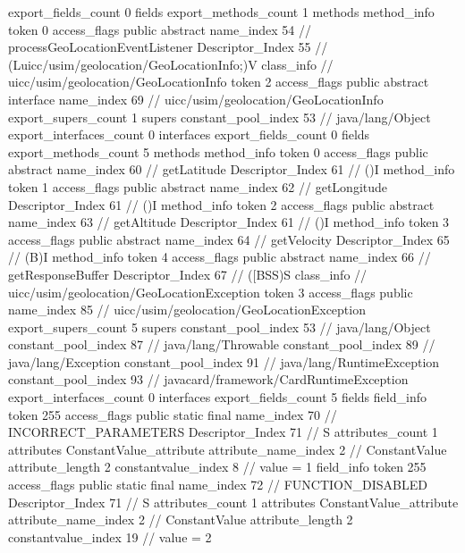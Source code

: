 {{{{			}
			export_fields_count	0
			fields {
			}
			export_methods_count	1
			methods {
				method_info {
					token	0
					access_flags	public abstract
					name_index	54		// processGeoLocationEventListener
					Descriptor_Index	55		// (Luicc/usim/geolocation/GeoLocationInfo;)V
				}
			}
		}
		class_info {		// uicc/usim/geolocation/GeoLocationInfo
			token	2
			access_flags	public abstract interface
			name_index	69		// uicc/usim/geolocation/GeoLocationInfo
			export_supers_count	1
			supers {
				constant_pool_index	53		// java/lang/Object
			}
			export_interfaces_count	0
			interfaces {
			}
			export_fields_count	0
			fields {
			}
			export_methods_count	5
			methods {
				method_info {
					token	0
					access_flags	public abstract
					name_index	60		// getLatitude
					Descriptor_Index	61		// ()I
				}
				method_info {
					token	1
					access_flags	public abstract
					name_index	62		// getLongitude
					Descriptor_Index	61		// ()I
				}
				method_info {
					token	2
					access_flags	public abstract
					name_index	63		// getAltitude
					Descriptor_Index	61		// ()I
				}
				method_info {
					token	3
					access_flags	public abstract
					name_index	64		// getVelocity
					Descriptor_Index	65		// (B)I
				}
				method_info {
					token	4
					access_flags	public abstract
					name_index	66		// getResponseBuffer
					Descriptor_Index	67		// ([BSS)S
				}
			}
		}
		class_info {		// uicc/usim/geolocation/GeoLocationException
			token	3
			access_flags	public
			name_index	85		// uicc/usim/geolocation/GeoLocationException
			export_supers_count	5
			supers {
				constant_pool_index	53		// java/lang/Object
				constant_pool_index	87		// java/lang/Throwable
				constant_pool_index	89		// java/lang/Exception
				constant_pool_index	91		// java/lang/RuntimeException
				constant_pool_index	93		// javacard/framework/CardRuntimeException
			}
			export_interfaces_count	0
			interfaces {
			}
			export_fields_count	5
			fields {
			field_info {
				token	255
				access_flags	public static final
				name_index	70		// INCORRECT_PARAMETERS
				Descriptor_Index	71		// S
				attributes_count	1
				attributes {
				ConstantValue_attribute {
					attribute_name_index	2		// ConstantValue
					attribute_length	2
					constantvalue_index	8		// value = 1
				}
				}
			}
			field_info {
				token	255
				access_flags	public static final
				name_index	72		// FUNCTION_DISABLED
				Descriptor_Index	71		// S
				attributes_count	1
				attributes {
				ConstantValue_attribute {
					attribute_name_index	2		// ConstantValue
					attribute_length	2
					constantvalue_index	19		// value = 2
}}}}}}}
